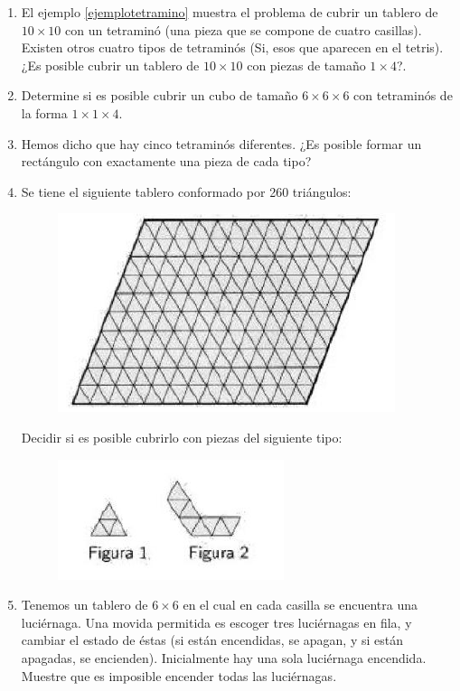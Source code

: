 \begin{enumerate}
	\item El ejemplo \ref{ejemplotetramino} muestra el problema de cubrir un tablero de $10\times 10$ con un tetramin\'o (una pieza que se compone de cuatro casillas). Existen otros cuatro tipos de tetramin\'os (Si, esos que aparecen en el tetris). ¿Es posible cubrir un tablero de  $10\times 10$ con piezas de tamaño $1\times 4$?.
	
	\item Determine si es posible cubrir un cubo de tamaño $6 \times 6 \times 6$ con tetramin\'os de la forma $1\times 1 \times 4$.
	
	\item Hemos dicho que hay cinco tetramin\'os diferentes. ¿Es posible formar un rect\'angulo con exactamente una pieza de cada tipo?
	
	\item Se tiene el siguiente tablero conformado por 260 tri\'angulos:
	
	\begin{figure}[h!]
		\centering
		\includegraphics[scale=.7]{imgs/color1.png}
	\end{figure}
	Decidir si es posible cubrirlo con piezas del siguiente tipo:
	
	\begin{figure}[h!]
		\centering
		\includegraphics[scale=.7]{imgs/color2.png}
	\end{figure}

	\item Tenemos un tablero de $6 \times 6$ en el cual en cada casilla se encuentra una luci\'ernaga. Una movida permitida es escoger tres luci\'ernagas en fila, y cambiar el estado de \'estas (si est\'an encendidas, se apagan, y si est\'an apagadas, se encienden). Inicialmente hay una sola luci\'ernaga encendida. Muestre que es imposible encender todas las luci\'ernagas.

	

	
\end{enumerate}
